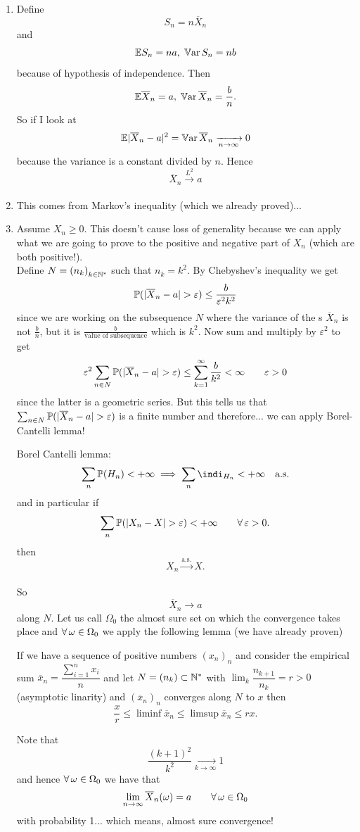 \documentclass{report}
\begin{document}
\begin{fancyproof}
	\begin{enumerate}
		\item[\circled{1}] Define
		\[S_n=n\overline{X}_{n}\]
		and 
		\[\mathbb{E} S_n=na,\;\mathbb{V}\mathrm{ar}\, S_n=nb\]
		because of hypothesis of independence. Then
		\[\mathbb{E} \overline{X}_{n}=a,\;\mathbb{V}\mathrm{ar}\, \overline{X}_{n}=\frac{b}{n}.\]
		So if I look at
		\[
		\mathbb{E} |\overline{X}_{n}-a|^{2}=\mathbb{V}\mathrm{ar}\, \overline{X}_{n}\xrightarrow[n\to\infty]{}0
		\]
		because the variance is a constant divided by $n$.
		Hence 
		\[\overline{X}_{n}\xrightarrow[]{L^{2}}a\]
		\item[\circled{2}] This comes from Markov's inequality (which we already proved)...
		\item[\circled{3}] Assume $X_n\geq0$. This doesn't cause loss of generality because we can apply what we are going to prove to the positive and negative part of $X_n$ (which are both positive!).\\
		Define $N={(n_k)}_{k\in\mathbb{N}^{*}}$ such that $n_k=k^2$. By Chebyshev's inequality we get
		\[\pr(|\overline{X}_{n}-a|>\varepsilon)\leq\frac{b}{\varepsilon^2k^2}\]
		since we are working on the subsequence $N$ where the variance of the \rv s $ \overline{X}_{n}$ is not $\frac{b}{n}$, but it is $\frac{b}{\text{value of subsequence}}$ which is $k^2$. Now sum and multiply by $\varepsilon^2$ to get
		\[\varepsilon^{2}\sum_{n\in N}\pr(|\overline{X}_{n}-a|>\varepsilon)\leq\sum_{k=1}^{\infty}\frac{b}{k^2}<\infty\qquad\varepsilon>0\]
		since the latter is a geometric series. But this tells us that $\sum_{n\in N}\pr(|\overline{X}_{n}-a|>\varepsilon)$ is a finite number and therefore... we can apply Borel-Cantelli lemma!
		\begin{revise}
			Borel Cantelli lemma:
			\[\sum_n\pr(H_n)<+\infty\implies\sum_n\indi_{H_n}<+\infty\quad\text{a.s.}\]
			and in particular if
			\[\sum_n\pr(|X_n-X|>\varepsilon)<+\infty\qquad\every\varepsilon>0.\]
			then 
			\[X_n\xrightarrow[]{\text{a.s.}}X.\]
		\end{revise}
		So 
		\[\overline{X}_{n}\to a\]
		along $N$. Let us call $\Omega_0$ the almost sure set on which the convergence takes place and
		$\forall\,\omega\in\Omega_0$ we apply the following lemma (we have already proven)
		\begin{revise}
			If we have a sequence of positive numbers ${(x_n)}_{n}$ and consider the empirical sum $\overline{x}_{n}=\dfrac{\sum_{i=1}^{n}x_i}{n}$ and let $N=(n_k)\subset{\mathbb{N}^{*}}$ with $\lim_k\dfrac{n_{k+1}}{n_{k}}=r>0$ (asymptotic linarity) and ${(\overline{x}_{n})}_{n}$ converges along $N$ to $x$ then
			\[\frac{x}{r}\leq\liminf \overline{x}_{n}\leq\limsup \overline{x}_{n}\leq rx.\]
		\end{revise}
		Note that 
		\[\frac{(k+1)^{2}}{k^{2}}\xrightarrow[k\to\infty]{}1\]
		and hence $\forall\, \omega\in\Omega_0$ we have that
		\[\lim_{n\to\infty}\overline{X}_n(\omega)=a\qquad\forall\,\omega\in\Omega_0\]
		with probability 1... which means, almost sure convergence!
	\end{enumerate}
\end{fancyproof}
\end{document}

